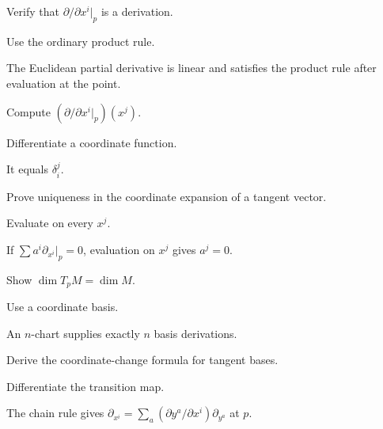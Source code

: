 \begin{exercise}\label{exr:vii04-03}
Verify that \(\partial/\partial x^i|_p\) is a derivation.
\end{exercise}
\begin{hint}
Use the ordinary product rule.
\end{hint}
\begin{solution}
The Euclidean partial derivative is linear and satisfies the product rule after evaluation at the point.
\end{solution}

\begin{exercise}\label{exr:vii04-04}
Compute \((\partial/\partial x^i|_p)(x^j)\).
\end{exercise}
\begin{hint}
Differentiate a coordinate function.
\end{hint}
\begin{solution}
It equals \(\delta_i^j\).
\end{solution}

\begin{exercise}\label{exr:vii04-05}
Prove uniqueness in the coordinate expansion of a tangent vector.
\end{exercise}
\begin{hint}
Evaluate on every \(x^j\).
\end{hint}
\begin{solution}
If \(\sum a^i\partial_{x^i}|_p=0\), evaluation on \(x^j\) gives \(a^j=0\).
\end{solution}

\begin{exercise}\label{exr:vii04-06}
Show \(\dim T_pM=\dim M\).
\end{exercise}
\begin{hint}
Use a coordinate basis.
\end{hint}
\begin{solution}
An \(n\)-chart supplies exactly \(n\) basis derivations.
\end{solution}

\begin{exercise}\label{exr:vii04-07}
Derive the coordinate-change formula for tangent bases.
\end{exercise}
\begin{hint}
Differentiate the transition map.
\end{hint}
\begin{solution}
The chain rule gives \(\partial_{x^i}=\sum_a(\partial y^a/\partial x^i)\partial_{y^a}\) at \(p\).
\end{solution}

